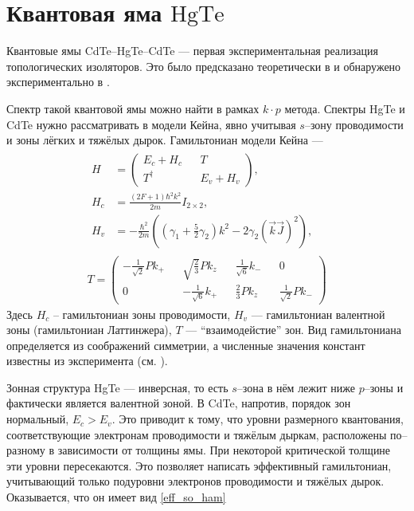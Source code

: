 \section{Квантовая яма $\mathrm{HgTe}$}
Квантовые ямы CdTe--HgTe--CdTe --- первая экспериментальная реализация
топологических изоляторов. Это было предсказано теоретически в \cite{Bernevig2006} и
обнаружено экспериментально в \cite{Konig2007}. 

Спектр такой квантовой ямы можно найти в рамках $k\cdot p$ метода. Спектры HgTe и CdTe 
нужно рассматривать в модели Кейна, явно учитывая $s$--зону проводимости и зоны 
лёгких и тяжёлых дырок. Гамильтониан модели Кейна --- 
\begin{equation}
    \begin{gathered}
        \begin{split}
            H &= \begin{pmatrix}
                    E_c + H_c &&  T \\
                    T^\dagger && E_v + H_v
                \end{pmatrix},\\
            H_c& = \frac{(2F+1)\hbar^2k^2}{2m}I_{2\times2},\\
            H_v& = -\frac{\hbar^2}{2m}((\gamma_1 + \frac52\gamma_2)k^2 - 
                2\gamma_2(\vec{k}\vec{J})^2), 
        \end{split}\\
        T = \begin{pmatrix}
                 -\frac{1}{\sqrt{2}}Pk_{+} && \sqrt{\frac23}Pk_z && 
                                        \frac{1}{\sqrt{6}}k_{-} && 0  \\
                  0 && -\frac{1}{\sqrt{6}}k_{+} && \frac{2}{3}P k_z 
                                        && \frac{1}{\sqrt{2}}P k_{-}
            \end{pmatrix}
    \end{gathered}
\end{equation}
Здесь $H_c$ -- гамильтониан зоны проводимости, $H_v$ --- гамильтониан валентной зоны
(гамильтониан Латтинжера), $T$ --- ``взаимодейстие'' зон. Вид гамильтониана определяется
из соображений симметрии, а численные значения констант известны из эксперимента 
(см. \cite{Novik2005}).

Зонная структура HgTe --- инверсная, то есть $s$--зона в нём лежит ниже $p$--зоны и
фактически является валентной зоной.
В CdTe, напротив, порядок зон нормальный, $E_c > E_v$. Это приводит к тому, что
уровни размерного квантования, соответствующие электронам проводимости и тяжёлым 
дыркам, расположены по--разному в зависимости от толщины ямы. При некоторой критической
толщине эти уровни пересекаются. Это позволяет написать эффективный гамильтониан, учитывающий
только подуровни электронов проводимости и тяжёлых дырок. Оказывается, что он имеет вид
\eqref{eff_so_ham}
